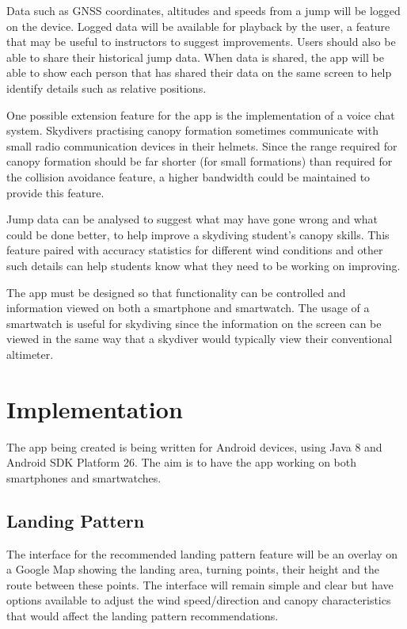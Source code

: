 \documentclass[11pt, a4paper, twocolumn]{article}
\begin{document}
Data such as GNSS coordinates, altitudes and speeds from a jump will be logged on the device. Logged data will be available for playback by the user, a feature that may be useful to instructors to suggest improvements. Users should also be able to share their historical jump data. When data is shared, the app will be able to show each person that has shared their data on the same screen to help identify details such as relative positions.

One possible extension feature for the app is the implementation of a voice chat system. Skydivers practising canopy formation sometimes communicate with small radio communication devices in their helmets. Since the range required for canopy formation should be far shorter (for small formations) than required for the collision avoidance feature, a higher bandwidth could be maintained to provide this feature.

Jump data can be analysed to suggest what may have gone wrong and what could be done better, to help improve a skydiving student's canopy skills. This feature paired with accuracy statistics for different wind conditions and other such details can help students know what they need to be working on improving.

The app must be designed so that functionality can be controlled and information viewed on both a smartphone and smartwatch. The usage of a smartwatch is useful for skydiving since the information on the screen can be viewed in the same way that a skydiver would typically view their conventional altimeter.

\section{Implementation}\label{sec:implementation} %
The app being created is being written for Android devices, using Java 8 and Android SDK Platform 26. The aim is to have the app working on both smartphones and smartwatches.

\subsection{Landing Pattern} %
The interface for the recommended landing pattern feature will be an overlay on a Google Map showing the landing area, turning points, their height and the route between these points. The interface will remain simple and clear but have options available to adjust the wind speed/direction and canopy characteristics that would affect the landing pattern recommendations.
\end{document}
